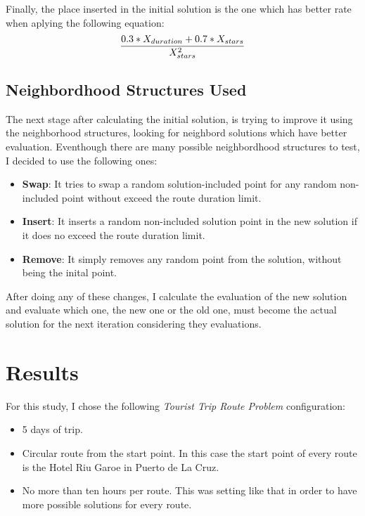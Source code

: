 \documentclass[preprint,14pt]{elsarticle}
\begin{document}
Finally, the place inserted in the initial solution is the one which has better rate when aplying the following equation: \\

\begin{equation}
    \frac{0.3 * X_{duration} + 0.7 * X_{stars}}{X_{stars}^{2}}    \\
 \end{equation}

\break
\subsection{Neighbordhood Structures Used}

The next stage after calculating the initial solution, is trying to improve it using the neighborhood structures, looking for neighbord solutions which have better evaluation. Eventhough there are many possible neighbordhood structures to test, I decided to use the following ones:

\begin{itemize}
    \item \textbf{Swap}: It tries to swap a random solution-included point for any random non-included point without exceed the route duration limit.
    \item \textbf{Insert}: It inserts a random non-included solution point in the new solution if it does no exceed the route duration limit.
    \item \textbf{Remove}: It simply removes any random point from the solution, without being the inital point.
\end{itemize}

After doing any of these changes, I calculate the evaluation of the new solution and evaluate which one, the new one or the old one, must become the actual solution for the next iteration considering they evaluations.

\section{Results}
\label{S:results}

For this study, I chose the following \textit{Tourist Trip Route Problem} configuration:
\begin{itemize}
    \item 5 days of trip.
    \item Circular route from the start point. In this case the start point of every route is the Hotel Riu Garoe in Puerto de La Cruz.
    \item No more than ten hours per route. This was setting like that in order to have more possible solutions for every route.
\end{itemize}
\end{document}
